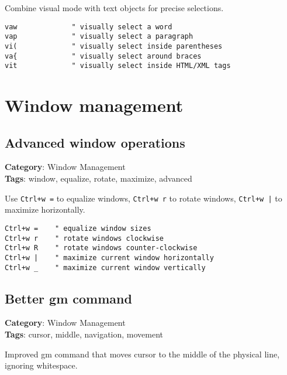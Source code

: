 {{{{{{{{{{{{{{{{{{Combine visual mode with text objects for precise selections.

\begin{Exa*}{}
\begin{Verbatim}[fontsize=\footnotesize, breaklines, breakanywhere]
vaw             " visually select a word
vap             " visually select a paragraph  
vi(             " visually select inside parentheses
va{             " visually select around braces
vit             " visually select inside HTML/XML tags
\end{Verbatim}
\end{Exa*}

\chapter{Window management}
\section{Advanced window operations}

\textbf{Category}: Window Management\\ \textbf{Tags}: window, equalize, rotate, maximize, advanced
\vspace{0.5cm}

Use {\footnotesize \Verb§Ctrl+w =§} to equalize windows, {\footnotesize \Verb§Ctrl+w r§} to rotate windows, {\footnotesize \Verb§Ctrl+w |§} to maximize horizontally.

\begin{Exa*}{}
\begin{Verbatim}[fontsize=\footnotesize, breaklines, breakanywhere]
Ctrl+w =    " equalize window sizes
Ctrl+w r    " rotate windows clockwise
Ctrl+w R    " rotate windows counter-clockwise  
Ctrl+w |    " maximize current window horizontally
Ctrl+w _    " maximize current window vertically
\end{Verbatim}
\end{Exa*}

\section{Better gm command}

\textbf{Category}: Window Management\\ \textbf{Tags}: cursor, middle, navigation, movement
\vspace{0.5cm}

Improved gm command that moves cursor to the middle of the physical line, ignoring whitespace.

}}}}}}}}}}}}}}}}}}
